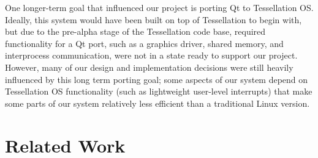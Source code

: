 \documentclass[letterpaper,twocolumn,11pt]{article}
\begin{document}
One longer-term goal that influenced our project is porting Qt to Tessellation OS. Ideally, this system would have been built on top of Tessellation to begin with, but due to the pre-alpha stage of the Tessellation code base, required functionality for a Qt port, such as a graphics driver, shared memory, and interprocess communication, were not in a state ready to support our project. However, many of our design and implementation decisions were still heavily influenced by this long term porting goal; some aspects of our system depend on Tessellation OS functionality (such as lightweight user-level interrupts) that make some parts of our system relatively less efficient than a traditional Linux version. 





\section{Related Work}
\end{document}

